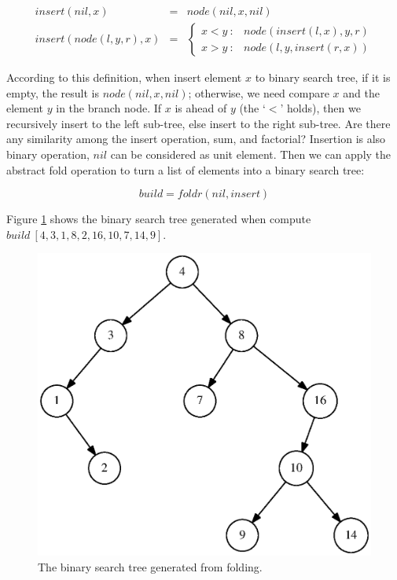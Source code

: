 \documentclass{article}
\begin{document}
\[
\begin{array}{rcl}
  insert(nil, x) & = & node(nil, x, nil) \\
  insert(node(l, y, r), x) & = & \left.
  \begin{cases}
  x < y\ : & node(insert(l, x), y, r) \\
  x > y\ : & node(l, y, insert(r, x))
  \end{cases} \right.
\end{array}
\label{eq:BST-insert}
\]

According to this definition, when insert element $x$ to binary search tree, if it is empty, the result is $node(nil, x, nil)$; otherwise, we need compare $x$ and the element $y$ in the branch node. If $x$ is ahead of $y$ (the `$<$' holds), then we recursively insert to the left sub-tree, else insert to the right sub-tree. Are there any similarity among the insert operation, sum, and factorial? Insertion is also binary operation, $nil$ can be considered as unit element. Then we can apply the abstract fold operation to turn a list of elements into a binary search tree:

\[
build = foldr(nil, insert)
\]

Figure \ref{fig:bst-example} shows the binary search tree generated when compute $build\ [4, 3, 1, 8, 2, 16, 10, 7, 14, 9]$.

\begin{figure}[htbp]
  \centering
  \includegraphics[scale=0.5]{img/bst-example.ps}
  \caption{The binary search tree generated from folding.}
  \label{fig:bst-example}
\end{figure}
\end{document}
